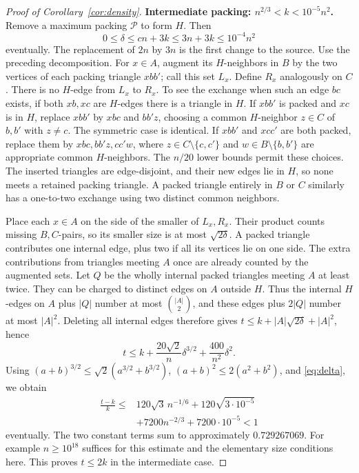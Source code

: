\documentclass[11pt]{article}
\theoremstyle{definition}\newtheorem{definition}[theorem]{Definition}
\theoremstyle{remark}\newtheorem{remark}[theorem]{Remark}
\begin{document}
\begin{proof}[Proof of Corollary~\ref{cor:density}]
\par\medskip\noindent\textbf{Intermediate packing: $n^{2/3}<k<10^{-5}n^2$.}
Remove a maximum packing $\mathcal P$ to form $H$. Then
\begin{equation}\label{eq:delta}
0\le\delta\le cn+3k\le3n+3k\le10^{-4}n^2
\end{equation}
eventually. The replacement of $2n$ by $3n$ is the first change to the
source. Use the preceding decomposition. For $x\in A$, augment its
$H$-neighbors in $B$ by the two vertices of each packing triangle
$xbb'$; call this set $L_x$. Define $R_x$ analogously on $C$.
There is no $H$-edge from $L_x$ to $R_x$. To see the exchange when
such an edge $bc$ exists, if both $xb,xc$ are $H$-edges there is a
triangle in $H$. If $xbb'$ is packed and $xc$ is in $H$, replace
$xbb'$ by $xbc$ and $bb'z$, choosing a common $H$-neighbor $z\in C$
of $b,b'$ with $z\ne c$. The symmetric case is identical. If
$xbb'$ and $xcc'$ are both packed, replace them by $xbc,bb'z,cc'w$,
where $z\in C\setminus\{c,c'\}$ and
$w\in B\setminus\{b,b'\}$ are appropriate common $H$-neighbors.
The $n/20$ lower bounds permit these choices. The inserted triangles
are edge-disjoint, and their new edges lie in $H$, so none meets a
retained packing triangle. A packed triangle entirely in $B$ or $C$
similarly has a one-to-two exchange using two distinct common neighbors.

Place each $x\in A$ on the side of the smaller of $L_x,R_x$.
Their product counts missing $B,C$-pairs, so its smaller size is at
most $\sqrt{2\delta}$. A packed triangle contributes one internal
edge, plus two if all its vertices lie on one side. The extra
contributions from triangles meeting $A$ once are already counted
by the augmented sets. Let $Q$ be the wholly internal packed triangles
meeting $A$ at least twice. They can be charged to distinct edges on
$A$ outside $H$. Thus the internal $H$-edges on $A$ plus $|Q|$ number
at most $\binom{|A|}{2}$, and these edges plus $2|Q|$ number at most
$|A|^2$. Deleting all internal edges therefore gives
$t\le k+|A|\sqrt{2\delta}+|A|^2$, hence
\begin{equation}\label{eq:middle}
t\le k+\frac{20\sqrt2}{n}\delta^{3/2}+\frac{400}{n^2}\delta^2.
\end{equation}
Using $(a+b)^{3/2}\le\sqrt2(a^{3/2}+b^{3/2})$,
$(a+b)^2\le2(a^2+b^2)$, and \eqref{eq:delta}, we obtain
\begin{equation}\label{eq:margin}
\begin{aligned}
\frac{t-k}{k}\le{}&120\sqrt3\,n^{-1/6}
 +120\sqrt{3\cdot10^{-5}}\\
 &+7200n^{-2/3}+7200\cdot10^{-5}<1
\end{aligned}
\end{equation}
eventually. The two constant terms sum to approximately $0.729267069$.
For example $n\ge10^{18}$ suffices for this estimate and the elementary
size conditions here. This proves $t\le2k$ in the intermediate case.


\end{proof}
\end{document}
